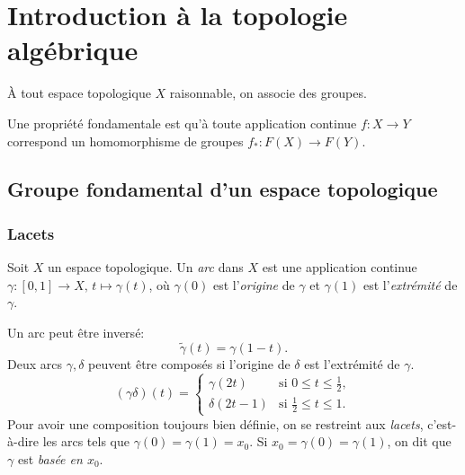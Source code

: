 
\chapter{Introduction à la topologie algébrique}

  À tout espace topologique $X$ raisonnable, on associe des groupes.

  Une propriété fondamentale est qu'à toute application continue $f: X \to Y$ correspond un homomorphisme de
  groupes $f_\ast:F(X) \to F(Y)$.

  \section{Groupe fondamental d'un espace topologique}
  \label{sec:grp-fondamental-esp-topo}

    \subsection{Lacets}

    \begin{defi}
      Soit $X$ un espace topologique. Un \emph{arc} dans $X$ est une application continue $\gamma: [0,1] \to
      X,\, t \mapsto \gamma(t)$, où $\gamma(0)$ est l'\emph{origine} de $\gamma$ et $\gamma(1)$ est
      l'\emph{extrémité} de $\gamma$.
    \end{defi}

    
    Un arc peut être inversé:
      \[\tilde{\gamma}(t) = \gamma(1-t).\]
    Deux arcs $\gamma, \delta$ peuvent être composés si l'origine de $\delta$ est l'extrémité de $\gamma$. 
      \[(\gamma\delta)(t) =
      \begin{cases}
        \gamma(2t) & \text{si } 0 \leq t \leq \frac{1}{2},\\
        \delta(2t-1) & \text{si } \frac{1}{2} \leq t \leq 1.
      \end{cases}
      \]
    Pour avoir une composition toujours bien définie, on se restreint aux \emph{lacets}, c'est-à-dire les arcs
    tels que $\gamma(0) = \gamma(1) = x_0$. Si $x_0 = \gamma(0) = \gamma(1)$, on dit que $\gamma$ est
    \emph{basée en $x_0$}.

